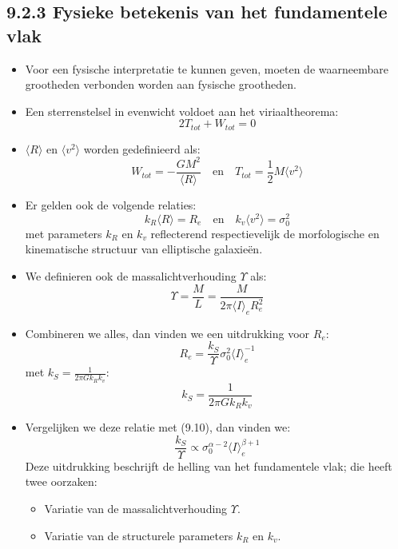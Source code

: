 \documentclass[10pt,a4paper]{article}
\renewenvironment{equation}{\begin{equation*}}{\end{equation*}}
\begin{document}
\subsection*{9.2.3 Fysieke betekenis van het fundamentele vlak}
\begin{itemize}
  \item Voor een fysische interpretatie te kunnen geven, moeten de waarneembare grootheden verbonden worden aan fysische grootheden.
  \item Een sterrenstelsel in evenwicht voldoet aan het viriaaltheorema:
  \begin{equation}
  2T_{tot} + W_{tot}= 0
  \tag{9.12}
  \end{equation}
  \item $\langle R\rangle$ en $\langle v^2\rangle$ worden gedefinieerd als:
  \begin{equation}
  W_{tot}=-\frac{GM^2}{\langle R\rangle}
  \quad \text{en} \quad
  T_{tot}=\frac{1}{2}M\langle v^2\rangle
  \tag{9.13}
  \end{equation}
  \item Er gelden ook de volgende relaties:
  \begin{equation}
  k_R\langle R\rangle = R_e
  \quad \text{en} \quad
  k_v\langle v^2\rangle = \sigma_0^2
  \tag{9.14}
  \end{equation}
  met parameters $k_R$ en $k_v$ reflecterend respectievelijk de morfologische en kinematische structuur van elliptische galaxieën.
  \item We definieren ook de massalichtverhouding $\Upsilon$ als:
  \begin{equation}
  \Upsilon = \frac{M}{L} = \frac{M}{2\pi \langle I\rangle_e R_e^2}
  \tag{9.15}
  \end{equation}
  \item Combineren we alles, dan vinden we een uitdrukking voor $R_e$:
  \begin{equation}
  R_e = \frac{k_S}{\Upsilon}\sigma_0^2\langle I\rangle_e^{-1}
  \tag{9.16}
  \end{equation}
  met $k_S = \frac{1}{2\pi Gk_Rk_v}$:
  \begin{equation}
  k_S = \frac{1}{2\pi Gk_Rk_v}
  \tag{9.17}
  \end{equation}
  \item Vergelijken we deze relatie met (9.10), dan vinden we:
  \[
  \frac{k_S}{\Upsilon} \propto \sigma_0^{\alpha-2}\langle I\rangle_e^{\beta+1}
  \]
  Deze uitdrukking beschrijft de helling van het fundamentele vlak; die heeft twee oorzaken:
  \begin{itemize}
    \item Variatie van de massalichtverhouding $\Upsilon$.
    \item Variatie van de structurele parameters $k_R$ en $k_v$.
  \end{itemize}
\end{itemize}
\end{document}
